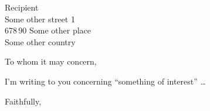 \documentclass[a4paper]{letter}
\begin{document}
\begin{letter}{%
    Recipient\\
    Some other street 1\\
    678\,90 Some other place\\
    Some other country
  }
  \opening{To whom it may concern,}

  I'm writing to you concerning \enquote{something of interest} \dots

  \closing{Faithfully,}


\end{letter}
\end{document}
